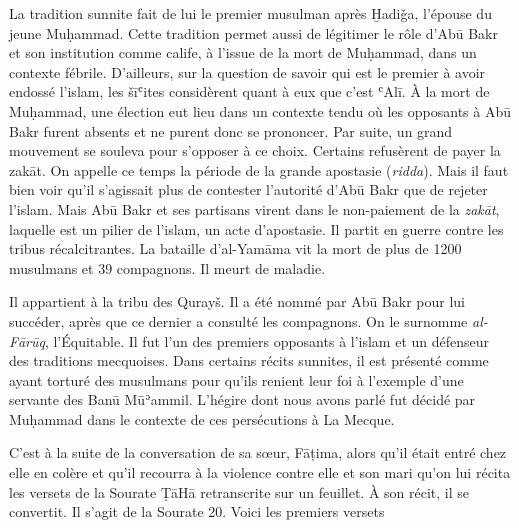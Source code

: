 La tradition sunnite fait de lui le premier musulman après Ḫadiǧa,
l'épouse du jeune Muḥammad. Cette tradition permet aussi de légitimer le
rôle d'Abū Bakr et son institution comme calife, à l'issue de la mort de
Muḥammad, dans un contexte fébrile. D'ailleurs, sur la question de
savoir qui est le premier à avoir endossé l'islam, les šīʿites
considèrent quant à eux que c'est ʿAlī. À la mort de Muḥammad, une
élection eut lieu dans un contexte tendu où les opposants à Abū Bakr
furent absents et ne purent donc se prononcer. Par suite, un grand
mouvement se souleva pour s'opposer à ce choix. Certains refusèrent de
payer la zakāt. On appelle ce temps la période de la grande apostasie
(\emph{ridda}). Mais il faut bien voir qu'il s'agissait plus de
contester l'autorité d'Abū Bakr que de rejeter l'islam. Mais Abū Bakr et
ses partisans virent dans le non-paiement de la \emph{zakāt}, laquelle
est un pilier de l'islam, un acte d'apostasie. Il partit en guerre
contre les tribus récalcitrantes. La bataille d'al-Yamāma vit la mort de
plus de 1200 musulmans et 39 compagnons. Il meurt de maladie.


Il appartient à la tribu des Qurayš. Il a été nommé par Abū Bakr pour
lui succéder, après que ce dernier a consulté les compagnons. On le
surnomme \emph{al-Fārūq}, l'Équitable. Il fut l'un des premiers
opposants à l'islam et un défenseur des traditions mecquoises. Dans
certains récits sunnites, il est présenté comme ayant torturé des
musulmans pour qu'ils renient leur foi à l'exemple d'une servante des
Banū Mūʾammil. L'hégire dont nous avons parlé fut décidé par Muḥammad
dans le contexte de ces persécutions à La Mecque.

C'est à la suite de la conversation de sa sœur, Fāṭima, alors qu'il
était entré chez elle en colère et qu'il recourra à la violence contre
elle et son mari qu'on lui récita les versets de la Sourate ṬāHā
retranscrite sur un feuillet. À son récit, il se convertit. Il s'agit de
la Sourate 20. Voici les premiers versets


